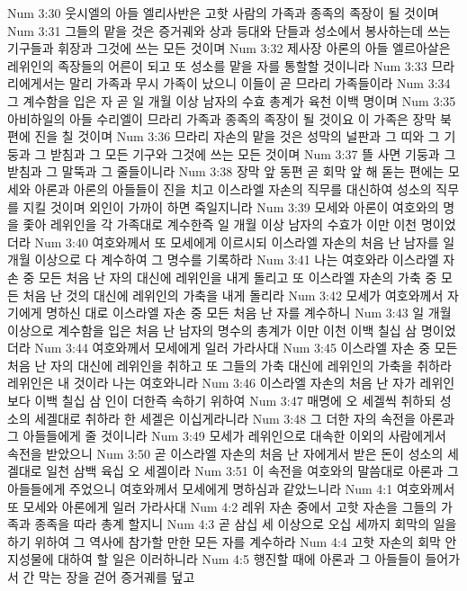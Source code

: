 Num 3:30  웃시엘의 아들 엘리사반은 고핫 사람의 가족과 종족의 족장이 될 것이며
Num 3:31  그들의 맡을 것은 증거궤와 상과 등대와 단들과 성소에서 봉사하는데 쓰는 기구들과 휘장과 그것에 쓰는 모든 것이며
Num 3:32  제사장 아론의 아들 엘르아살은 레위인의 족장들의 어른이 되고 또 성소를 맡을 자를 통할할 것이니라
Num 3:33  므라리에게서는 말리 가족과 무시 가족이 났으니 이들이 곧 므라리 가족들이라
Num 3:34  그 계수함을 입은 자 곧 일 개월 이상 남자의 수효 총계가 육천 이백 명이며
Num 3:35  아비하일의 아들 수리엘이 므라리 가족과 종족의 족장이 될 것이요 이 가족은 장막 북편에 진을 칠 것이며
Num 3:36  므라리 자손의 맡을 것은 성막의 널판과 그 띠와 그 기둥과 그 받침과 그 모든 기구와 그것에 쓰는 모든 것이며
Num 3:37  뜰 사면 기둥과 그 받침과 그 말뚝과 그 줄들이니라
Num 3:38  장막 앞 동편 곧 회막 앞 해 돋는 편에는 모세와 아론과 아론의 아들들이 진을 치고 이스라엘 자손의 직무를 대신하여 성소의 직무를 지킬 것이며 외인이 가까이 하면 죽일지니라
Num 3:39  모세와 아론이 여호와의 명을 좇아 레위인을 각 가족대로 계수한즉 일 개월 이상 남자의 수효가 이만 이천 명이었더라
Num 3:40  여호와께서 또 모세에게 이르시되 이스라엘 자손의 처음 난 남자를 일 개월 이상으로 다 계수하여 그 명수를 기록하라
Num 3:41  나는 여호와라 이스라엘 자손 중 모든 처음 난 자의 대신에 레위인을 내게 돌리고 또 이스라엘 자손의 가축 중 모든 처음 난 것의 대신에 레위인의 가축을 내게 돌리라
Num 3:42  모세가 여호와께서 자기에게 명하신 대로 이스라엘 자손 중 모든 처음 난 자를 계수하니
Num 3:43  일 개월 이상으로 계수함을 입은 처음 난 남자의 명수의 총계가 이만 이천 이백 칠십 삼 명이었더라
Num 3:44  여호와께서 모세에게 일러 가라사대
Num 3:45  이스라엘 자손 중 모든 처음 난 자의 대신에 레위인을 취하고 또 그들의 가축 대신에 레위인의 가축을 취하라 레위인은 내 것이라 나는 여호와니라
Num 3:46  이스라엘 자손의 처음 난 자가 레위인보다 이백 칠십 삼 인이 더한즉 속하기 위하여
Num 3:47  매명에 오 세겔씩 취하되 성소의 세겔대로 취하라 한 세겔은 이십게라니라
Num 3:48  그 더한 자의 속전을 아론과 그 아들들에게 줄 것이니라
Num 3:49  모세가 레위인으로 대속한 이외의 사람에게서 속전을 받았으니
Num 3:50  곧 이스라엘 자손의 처음 난 자에게서 받은 돈이 성소의 세겔대로 일천 삼백 육십 오 세겔이라
Num 3:51  이 속전을 여호와의 말씀대로 아론과 그 아들들에게 주었으니 여호와께서 모세에게 명하심과 같았느니라
Num 4:1  여호와께서 또 모세와 아론에게 일러 가라사대
Num 4:2  레위 자손 중에서 고핫 자손을 그들의 가족과 종족을 따라 총계 할지니
Num 4:3  곧 삼십 세 이상으로 오십 세까지 회막의 일을 하기 위하여 그 역사에 참가할 만한 모든 자를 계수하라
Num 4:4  고핫 자손의 회막 안 지성물에 대하여 할 일은 이러하니라
Num 4:5  행진할 때에 아론과 그 아들들이 들어가서 간 막는 장을 걷어 증거궤를 덮고
